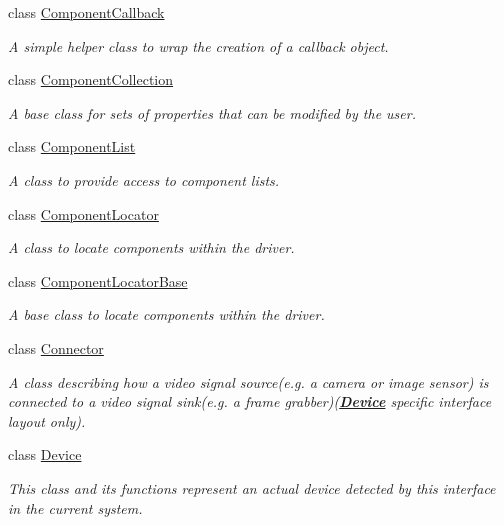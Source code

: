 \begin{DoxyCompactItemize}
class \hyperlink{classmv_i_m_p_a_c_t_1_1acquire_1_1_component_callback}{Component\+Callback}
\begin{DoxyCompactList}\small\item\em A simple helper class to wrap the creation of a callback object. \end{DoxyCompactList}\item 
class \hyperlink{classmv_i_m_p_a_c_t_1_1acquire_1_1_component_collection}{Component\+Collection}
\begin{DoxyCompactList}\small\item\em A base class for sets of properties that can be modified by the user. \end{DoxyCompactList}\item 
class \hyperlink{classmv_i_m_p_a_c_t_1_1acquire_1_1_component_list}{Component\+List}
\begin{DoxyCompactList}\small\item\em A class to provide access to component lists. \end{DoxyCompactList}\item 
class \hyperlink{classmv_i_m_p_a_c_t_1_1acquire_1_1_component_locator}{Component\+Locator}
\begin{DoxyCompactList}\small\item\em A class to locate components within the driver. \end{DoxyCompactList}\item 
class \hyperlink{classmv_i_m_p_a_c_t_1_1acquire_1_1_component_locator_base}{Component\+Locator\+Base}
\begin{DoxyCompactList}\small\item\em A base class to locate components within the driver. \end{DoxyCompactList}\item 
class \hyperlink{classmv_i_m_p_a_c_t_1_1acquire_1_1_connector}{Connector}
\begin{DoxyCompactList}\small\item\em A class describing how a video signal source(e.\+g. a camera or image sensor) is connected to a video signal sink(e.\+g. a frame grabber)({\bfseries \hyperlink{classmv_i_m_p_a_c_t_1_1acquire_1_1_device}{Device}} specific interface layout only). \end{DoxyCompactList}\item 
class \hyperlink{classmv_i_m_p_a_c_t_1_1acquire_1_1_device}{Device}
\begin{DoxyCompactList}\small\item\em This class and its functions represent an actual device detected by this interface in the current system. \end{DoxyCompactList}\item 

\end{DoxyCompactItemize}
